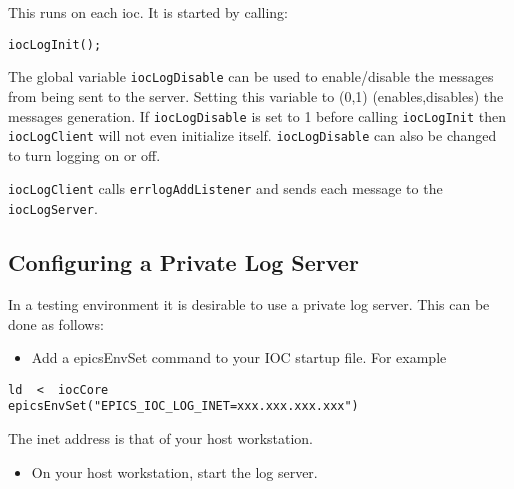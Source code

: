 This runs on each ioc. It is started by calling:

\begin{verbatim}iocLogInit();
\end{verbatim}The global variable \verb|iocLogDisable| can be used to enable/disable the messages from being sent to the server. Setting 
this variable to (0,1) (enables,disables) the messages generation. If \verb|iocLogDisable| is set to 1 before calling 
\verb|iocLogInit| then \verb|iocLogClient| will not even initialize itself. \verb|iocLogDisable| can also be changed to turn 
logging on or off.

\verb|iocLogClient| calls \verb|errlogAddListener| and sends each message to the \verb|iocLogServer|.

\subsection{Configuring a Private Log Server}

In a testing environment it is desirable to use a private log server. This can be done as follows:

\begin{itemize}\item Add a epicsEnvSet command to your IOC startup file. For example

\end{itemize}\begin{verbatim}ld  <  iocCore
epicsEnvSet("EPICS_IOC_LOG_INET=xxx.xxx.xxx.xxx")
\end{verbatim}\begin{description}\item The inet address is that of your host workstation.

\end{description}\begin{itemize}\item On your host workstation, start the log server.

\end{itemize}
